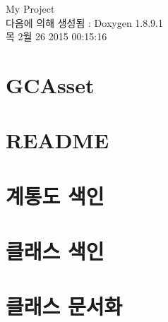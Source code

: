\documentclass[twoside]{book}
\newcommand{\+}{\discretionary{\mbox{\scriptsize$\hookleftarrow$}}{}{}}
\newcommand{\clearemptydoublepage}{%
  \newpage{\pagestyle{empty}\cleardoublepage}%
}
\begin{document}
\hypersetup{pageanchor=false,
             bookmarks=true,
             bookmarksnumbered=true,
             pdfencoding=unicode
            }
\begin{titlepage}
\vspace*{7cm}
\begin{center}%
{\Large My Project }\\
\vspace*{1cm}
{\large 다음에 의해 생성됨 \+:  Doxygen 1.8.9.1}\\
\vspace*{0.5cm}
{\small 목 2월 26 2015 00:15:16}\\
\end{center}
\end{titlepage}
\clearemptydoublepage
\tableofcontents
\clearemptydoublepage
{}
\hypersetup{pageanchor=true}

\chapter{G\+C\+Asset}
\label{index}\hypertarget{index}{}
\chapter{R\+E\+A\+D\+M\+E}
\label{md__c_1_devtools_workspace__g_c_asset__g_c_asset__assets__g_c_server__r_e_a_d_m_e}
\hypertarget{md__c_1_devtools_workspace__g_c_asset__g_c_asset__assets__g_c_server__r_e_a_d_m_e}{}

\chapter{계통도 색인}

\chapter{클래스 색인}

\chapter{클래스 문서화}






























\backmatter
\newpage
{}
\clearemptydoublepage
{}
\printindex
\end{document}
